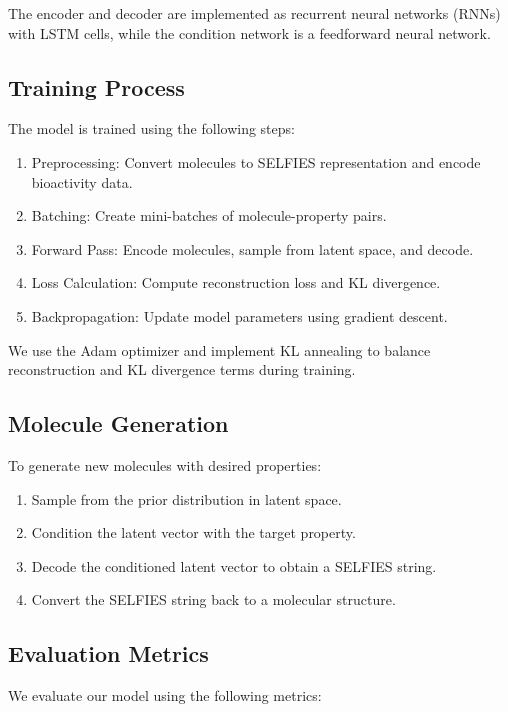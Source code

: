 The encoder and decoder are implemented as recurrent neural networks (RNNs) with LSTM cells, while the condition network is a feedforward neural network.

\subsection{Training Process}

The model is trained using the following steps:

\begin{enumerate}
    \item Preprocessing: Convert molecules to SELFIES representation and encode bioactivity data.
    \item Batching: Create mini-batches of molecule-property pairs.
    \item Forward Pass: Encode molecules, sample from latent space, and decode.
    \item Loss Calculation: Compute reconstruction loss and KL divergence.
    \item Backpropagation: Update model parameters using gradient descent.
\end{enumerate}

We use the Adam optimizer and implement KL annealing to balance reconstruction and KL divergence terms during training.

\subsection{Molecule Generation}

To generate new molecules with desired properties:

\begin{enumerate}
    \item Sample from the prior distribution in latent space.
    \item Condition the latent vector with the target property.
    \item Decode the conditioned latent vector to obtain a SELFIES string.
    \item Convert the SELFIES string back to a molecular structure.
\end{enumerate}

\subsection{Evaluation Metrics}

We evaluate our model using the following metrics:

